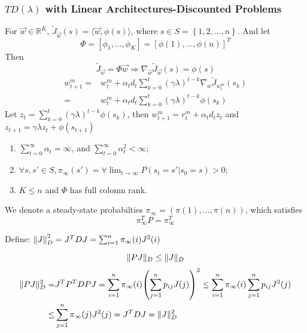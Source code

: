 \subsubsection{$ TD(\lambda) $ with Linear Architectures-Discounted Problems}%

For $ \vec{w} \in \mathbb{R}^{K} $, $ \tilde J_{\vec{w}} (s) = \langle \vec{w}, \phi(s) \rangle $, where $ s \in S = \left\{ 1, 2, \ldots, n \right\} $. And let 
\[
    \Phi = \left[ \phi_1, \ldots, \phi_K \right] = {\left[ \phi(1), \ldots, \phi(n) \right]}^T
\]
Then
\[
    \tilde J_{\vec{w}} = \Phi \vec{w} \Rightarrow \nabla_{\vec{w}} \tilde J_{\vec{w}}(s) = \phi(s)
\]
\begin{align*}
    w^{m}_{t+1} =& w^{m}_{t} + \alpha_t d_t \sum^{t}_{k = 0} {(\gamma\lambda)}^{t-k} \nabla_{w} \tilde J_{w^m_t}(s_k)\\
    =& w^{m}_{t} + \alpha_t d_t \sum^{t}_{k=0} {(\gamma\lambda)}^{t-k} \phi(s_k)
\end{align*}
Let $ z_t = \sum^{t}_{k=0} {(\gamma\lambda)}^{t-k} \phi(s_k) $, then $ w^{m}_{t+1} = r^{m}_{t} + \alpha_t d_t z_t $ and $ z_{t+1} = \gamma\lambda z_t + \phi(s_{t+1}) $

\begin{assumption}
    \begin{enumerate}
        \item $ \sum^{\infty}_{t=0} \alpha_t = \infty $, and $ \sum^{\infty}_{t=0} \alpha^2_t < \infty $;
        \item $ \forall s, s' \in S, \pi_\infty(s') = \forall \lim_{t \to \infty} P(s_t = s' | s_0 = s) > 0  $;
        \item $ K \le n $ and $ \Phi $ has full colomn rank.
    \end{enumerate}
\end{assumption}

We denote a steady-state probabilties $ \pi_\infty = \left( \pi(1), \ldots, \pi(n) \right) $, which satisfies
\[
    \pi_\infty^T P = \pi_\infty^T
\]

Define: $ {\Arrowvert J \Arrowvert}_D^2 = J^T D J = \sum^{n}_{i=1} \pi_{\infty}(i) J^2(i) $
\begin{lemma}
    \[
        \Arrowvert PJ \Arrowvert_D \le \Arrowvert J \Arrowvert_D
    \]
    \begin{align*}
        \Arrowvert PJ \Arrowvert^2_D =& J^T P^T D P J = \sum^{n}_{i=1} \pi_{\infty}(i) {\left( \sum^{n}_{j=1} p_{ij} J(j) \right)}^2 \le \sum^{n}_{i=1} \pi_\infty(i) \sum^{n}_{j=1} p_{ij}J^2(j)\\
        \le& \sum^{n}_{j=1} \pi_\infty(j) J^2(j) = J^T D J = \Arrowvert J \Arrowvert^2_{D}
    \end{align*}
\end{lemma}

